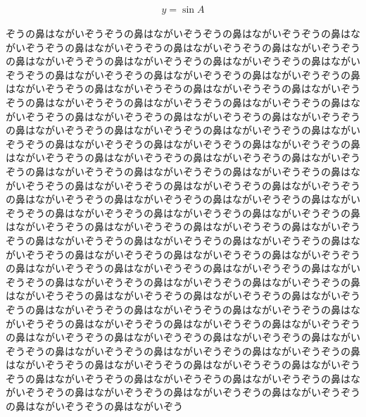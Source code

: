 \begin{align}
    y=\sin{A}
    \label{eq:test}
\end{align}


ぞうの鼻はながいぞうぞうの鼻はながいぞうぞうの鼻はながいぞうぞうの鼻はながいぞうぞうの鼻はながいぞうぞうの鼻はながいぞうぞうの鼻はながいぞうぞうの鼻はながいぞうぞうの鼻はながいぞうぞうの鼻はながいぞうぞうの鼻はながいぞうぞうの鼻はながいぞうぞうの鼻はながいぞうぞうの鼻はながいぞうぞうの鼻はながいぞうぞうの鼻はながいぞうぞうの鼻はながいぞうぞうの鼻はながいぞうぞうの鼻はながいぞうぞうの鼻はながいぞうぞうの鼻はながいぞうぞうの鼻はながいぞうぞうの鼻はながいぞうぞうの鼻はながいぞうぞうの鼻はながいぞうぞうの鼻はながいぞうぞうの鼻はながいぞうぞうの鼻はながいぞうぞうの鼻はながいぞうぞうの鼻はながいぞうぞうの鼻はながいぞうぞうの鼻はながいぞうぞうの鼻はながいぞうぞうの鼻はながいぞうぞうの鼻はながいぞうぞうの鼻はながいぞうぞうの鼻はながいぞうぞうの鼻はながいぞうぞうの鼻はながいぞうぞうの鼻はながいぞうぞうの鼻はながいぞうぞうの鼻はながいぞうぞうの鼻はながいぞうぞうの鼻はながいぞうぞうの鼻はながいぞうぞうの鼻はながいぞうぞうの鼻はながいぞうぞうの鼻はながいぞうぞうの鼻はながいぞうぞうの鼻はながいぞうぞうの鼻はながいぞうぞうの鼻はながいぞうぞうの鼻はながいぞうぞうの鼻はながいぞうぞうの鼻はながいぞうぞうの鼻はながいぞうぞうの鼻はながいぞうぞうの鼻はながいぞうぞうの鼻はながいぞうぞうの鼻はながいぞうぞうの鼻はながいぞうぞうの鼻はながいぞうぞうの鼻はながいぞうぞうの鼻はながいぞうぞうの鼻はながいぞうぞうの鼻はながいぞうぞうの鼻はながいぞうぞうの鼻はながいぞうぞうの鼻はながいぞうぞうの鼻はながいぞうぞうの鼻はながいぞうぞうの鼻はながいぞうぞうの鼻はながいぞうぞうの鼻はながいぞうぞうの鼻はながいぞうぞうの鼻はながいぞうぞうの鼻はながいぞうぞうの鼻はながいぞうぞうの鼻はながいぞうぞうの鼻はながいぞうぞうの鼻はながいぞうぞうの鼻はながいぞうぞうの鼻はながいぞうぞうの鼻はながいぞうぞうの鼻はながいぞうぞうの鼻はながいぞうぞうの鼻はながいぞうぞうの鼻はながいぞうぞうの鼻はながいぞうぞうの鼻はながいぞうぞうの鼻はながいぞうぞうの鼻はながいぞうぞうの鼻はながいぞうぞうの鼻はながいぞうぞうの鼻はながいぞうぞうの鼻はながいぞうぞうの鼻はながいぞうぞうの鼻はながいぞうぞうの鼻はながいぞう




